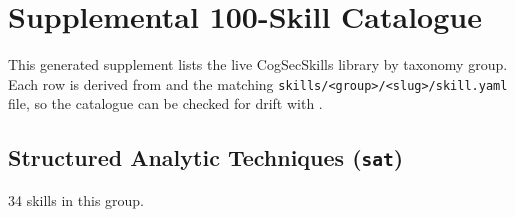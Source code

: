 \documentclass[
]{article}
\begin{document}
\newpage

\section{Supplemental 100-Skill
Catalogue}\label{sec:supplemental_skill_catalogue}

This generated supplement lists the live CogSecSkills library by
taxonomy group. Each row is derived from 
and the matching
\texttt{skills/\textless{}group\textgreater{}/\textless{}slug\textgreater{}/skill.yaml}
file, so the catalogue can be checked for drift with
.

\subsection{\texorpdfstring{Structured Analytic Techniques
(\texttt{sat})}{Structured Analytic Techniques (sat)}}\label{structured-analytic-techniques-sat}

34 skills in this group.
\end{document}
